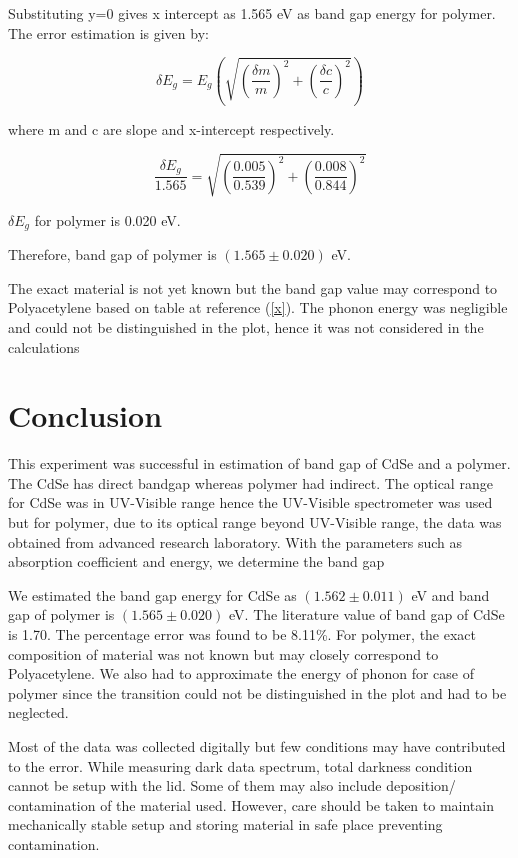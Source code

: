 \documentclass[a4paper, amsfonts, amssymb, amsmath, reprint, showkeys, nofootinbib, twoside]{revtex4-1}
\begin{document}
Substituting y=0 gives x intercept as 1.565 eV as band gap energy for polymer. The error estimation is given by:

\begin{equation}
	\delta E_g=E_g\left( \sqrt{\left(\frac{ \delta m}{m}\right)^2+\left(\frac{ \delta c}{c}\right)^2 }\right) 
\end{equation}

where m and c are slope and x-intercept respectively.

\begin{equation}
	\frac{\delta E_g}{1.565}= \sqrt{\left(\frac{0.005}{0.539}\right)^2+\left(\frac{0.008}{0.844}\right)^2 }
\end{equation}

$\delta E_g$ for polymer is 0.020 eV. 

Therefore, band gap of polymer is $(1.565\pm0.020)$ eV. 

The exact material is not yet known but the band gap value may correspond to Polyacetylene based on table at reference (\ref{x}). The phonon energy was negligible and could not be distinguished in the plot, hence it was not considered in the calculations

\section{Conclusion}
This experiment was successful in estimation of band gap of CdSe and a polymer. The CdSe has direct bandgap whereas polymer had indirect. The optical range for CdSe was in UV-Visible range hence the UV-Visible spectrometer was used but for polymer, due to its optical range beyond UV-Visible range, the data was obtained from advanced research laboratory. With the parameters such as absorption coefficient and energy, we determine the band gap

We estimated the band gap energy for CdSe as $(1.562\pm0.011)$ eV and band gap of polymer is $(1.565\pm0.020)$ eV. The literature value of band gap of CdSe is 1.70. The percentage error was found to be 8.11\%. For polymer, the exact composition of material was not known but may closely correspond to Polyacetylene. We also had to approximate the energy of phonon for case of polymer since the transition could not be distinguished in the plot and had to be neglected.

Most of the data was collected digitally but few conditions may have contributed to the error. While measuring dark data spectrum, total darkness condition cannot be setup with the lid. Some of them may also include deposition/ contamination of the material used. However, care should be taken to maintain mechanically stable setup and storing material in safe place preventing contamination.
\end{document}

